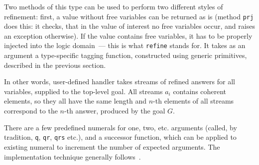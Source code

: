 Two methods of this type can be used to perform two different styles of refinement: first, a value without
free variables can be returned as is (method \lstinline{prj} does this: it checks, that in the value of
interest no free variables occur, and raises an exception otherwise). If the value contains free
variables, it has to be properly injected into the logic domain~--- this is what \lstinline{refine} stands
for. It takes as an argument a type-specific tagging function, constructed using generic
primitives, described in the previous section.

In other words, user-defined handler takes streams of refined answers for all variables, supplied to the top-level 
goal. All streams $a_i$ contains coherent elements, so they all have the same length and $n$-th elements of all 
streams correspond to the $n$-th answer, produced by the goal $G$.

There are a few predefined numerals for one, two, etc. arguments (called, by tradition, 
\lstinline{q}, \lstinline{qr}, \lstinline{qrs} etc.), and a successor function, which 
can be applied to existing numeral to increment the number of expected arguments. The
implementation technique generally follows~\cite{Unparsing, DoWeNeed}.
